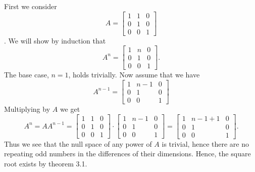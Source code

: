 \documentclass{article}
\begin{document}
\begin{solution}
  First we consider
  \[A = \begin{bmatrix} 1 & 1 & 0\\ 0 & 1 & 0\\ 0 & 0 & 1 \end{bmatrix}\].
  We will show by induction that
  \[A^n = \begin{bmatrix} 1 & n & 0\\ 0 & 1 & 0\\ 0 & 0 & 1 \end{bmatrix}.\]
  The base case, $n = 1$, holds trivially.
  Now assume that we have
  \[A^{n - 1} = \begin{bmatrix} 1 & n - 1 & 0\\ 0 & 1 & 0\\ 0 & 0 & 1 \end{bmatrix}\]
  Multiplying by $A$ we get
  \[A^n = AA^{n - 1} = \begin{bmatrix} 1 & 1 & 0\\ 0 & 1 & 0\\ 0 & 0 & 1 \end{bmatrix} \cdot \begin{bmatrix} 1 & n - 1 & 0\\ 0 & 1 & 0\\ 0 & 0 & 1 \end{bmatrix} = \begin{bmatrix} 1 & n - 1 + 1 & 0\\ 0 & 1 & 0\\ 0 & 0 & 1 \end{bmatrix}.\]
  Thus we see that the null space of any power of $A$ is trivial, hence there are no repeating odd numbers in the differences of their dimensions.
  Hence, the square root exists by theorem 3.1.


\end{solution}
\end{document}
